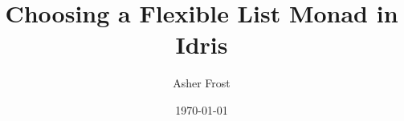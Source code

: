\documentclass{article}
\begin{document}
\title{Choosing a Flexible List Monad in Idris}
\author{Asher Frost}
\date{\today}
\maketitle	
	
\begin{abstract}
	\todo{}
\end{abstract}	





\printbibliography
\end{document}
